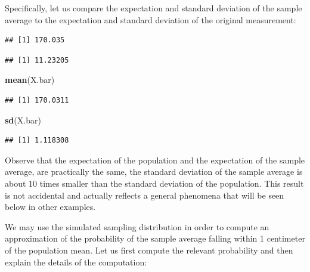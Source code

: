 \documentclass[
]{krantz}
\makeatletter
\newenvironment{Shaded}{\begin{snugshade}}{\end{snugshade}}
\newcommand{\FloatTok}[1]{\textcolor[rgb]{0.00,0.00,0.81}{#1}}
\newcommand{\KeywordTok}[1]{\textcolor[rgb]{0.13,0.29,0.53}{\textbf{#1}}}
\newcommand{\NormalTok}[1]{#1}
\newcommand{\OperatorTok}[1]{\textcolor[rgb]{0.81,0.36,0.00}{\textbf{#1}}}
\newenvironment{kframe}{%
\medskip{}
\setlength{\fboxsep}{.8em}
 \def\at@end@of@kframe{}%
 \ifinner\ifhmode%
  \def\at@end@of@kframe{\end{minipage}}%
  \begin{minipage}{\columnwidth}%
 \fi\fi%
 \def\FrameCommand##1{\hskip\@totalleftmargin \hskip-\fboxsep
 \colorbox{shadecolor}{##1}\hskip-\fboxsep
     \hskip-\linewidth \hskip-\@totalleftmargin \hskip\columnwidth}%
 \MakeFramed {\advance\hsize-\width
   \@totalleftmargin\z@ \linewidth\hsize
   \@setminipage}}%
 {\par\unskip\endMakeFramed%
 \at@end@of@kframe}
\renewenvironment{Shaded}{\begin{kframe}}{\end{kframe}}
\theoremstyle{definition}
\theoremstyle{definition}
\theoremstyle{definition}
\theoremstyle{remark}
\makeatother
\begin{document}
Specifically, let us compare the expectation and standard deviation of
the sample average to the expectation and standard deviation of the
original measurement:

\begin{Shaded}
\end{Shaded}

\begin{verbatim}
## [1] 170.035
\end{verbatim}

\begin{Shaded}
\end{Shaded}

\begin{verbatim}
## [1] 11.23205
\end{verbatim}

\begin{Shaded}
\begin{Highlighting}[]
\KeywordTok{mean}\NormalTok{(X.bar)}
\end{Highlighting}
\end{Shaded}

\begin{verbatim}
## [1] 170.0311
\end{verbatim}

\begin{Shaded}
\begin{Highlighting}[]
\KeywordTok{sd}\NormalTok{(X.bar)}
\end{Highlighting}
\end{Shaded}

\begin{verbatim}
## [1] 1.118308
\end{verbatim}

Observe that the expectation of the population and the expectation of
the sample average, are practically the same, the standard deviation of
the sample average is about 10 times smaller than the standard deviation
of the population. This result is not accidental and actually reflects a
general phenomena that will be seen below in other examples.

We may use the simulated sampling distribution in order to compute an
approximation of the probability of the sample average falling within 1
centimeter of the population mean. Let us first compute the relevant
probability and then explain the details of the computation:
\end{document}
